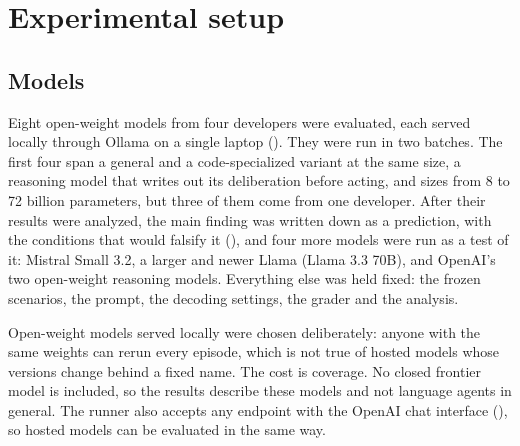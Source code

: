 \section{Experimental setup}\label{sec:setup}

\subsection{Models}\label{sec:models}

Eight open-weight models from four developers were evaluated, each served
locally through Ollama on a single laptop (). They were run in
two batches. The first four span a general and a code-specialized variant at the
same size, a reasoning model that writes out its deliberation before acting, and
sizes from 8 to 72 billion parameters, but three of them come from one developer.
After their results were analyzed, the main finding was written down as a
prediction, with the conditions that would falsify it (),
and four more models were run as a test of it: Mistral Small 3.2, a larger and
newer Llama (Llama 3.3 70B), and OpenAI's two open-weight reasoning models.
Everything else was held fixed: the frozen scenarios, the prompt, the decoding
settings, the grader and the analysis.

Open-weight models served locally were chosen deliberately: anyone with the same
weights can rerun every episode, which is not true of hosted models whose
versions change behind a fixed name. The cost is coverage. No closed frontier
model is included, so the results describe these models and not language agents
in general. The runner also accepts any endpoint with the OpenAI chat interface
(), so hosted models can be evaluated in the same way.

